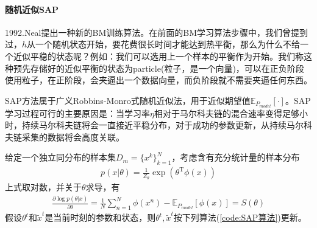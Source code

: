             \paragraph{随机近似SAP}1992.Neal\cite{1992.Neal}提出一种新的BM训练算法。在前面的BM学习算法步骤中，我们曾提到过，$h$从一个随机状态开始，要花费很长时间才能达到热平衡，那么为什么不给一个近似平稳的状态呢？例如：我们可以选用上一个样本的平衡作为开始。我们称这种预先存储好的近似平衡的状态为particle(粒子，是一个向量)，可以在正负阶段使用粒子，在正阶段，会夹逼出一个数据向量，而负阶段就不需要夹逼任何东西。
            \par
            SAP方法属于广义Robbins-Monro式随机近似法，用于近似期望值$\mathbb{E}_{P_{model}}[\cdot]$。SAP学习过程可行的主要原因是：当学习率$\eta$相对于马尔科夫链的混合速率变得足够小时，持续马尔科夫链将会一直接近平稳分布，对于成功的参数更新，从持续马尔科夫链采集的数据将会高度关联。
            \par
            给定一个独立同分布的样本集$D_m = \{x^k\}_{k=1}^N$，考虑含有充分统计量的样本分布
            \begin{align*}
            p(x|\theta) = \frac{1}{Z_\theta} \exp(\theta^\mathrm{T}\phi(x))
            \end{align*}
            上式取对数，并关于$\theta$求导，有
            \begin{align*}
            \frac{\partial \log p(\theta|x)}{\partial \theta} = \frac{1}{N}\sum_{n=1}^N\phi(x^n) - \mathbb{E}_{P_{model}}[\phi(x)] = S(\theta)
            \end{align*}
            假设$\theta^t$和$\tilde{x}^t$是当前时刻的参数和状态，则$\theta^t,\tilde{ x}^t$按下列算法(\ref{code:SAP算法})更新。
